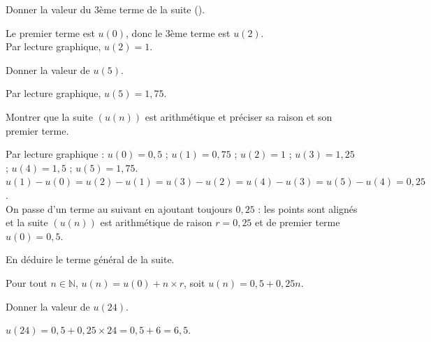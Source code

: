 \documentclass[11pt,a4paper]{article}  %
\begin{document}
\begin{enumMet}
	\item Donner la valeur du 3ème terme de la suite (\danger).
	\par
	\begin{corrBox}
		Le premier terme est $u(0)$, donc le 3ème terme est $u(2)$.\\
		Par lecture graphique, $u(2)=1$.
	\end{corrBox}

	\item Donner la valeur de $u(5)$.
	\par
	\begin{corrBox}
		Par lecture graphique, $u(5)=1,75$.
	\end{corrBox}

	\item Montrer que la suite $\left(u(n)\right)$ est arithmétique et préciser sa raison et son premier terme.
	\par
	\begin{corrBox}
		Par lecture graphique : $u(0)=0,5$ ; $u(1)=0,75$ ; $u(2)=1$ ; $u(3)=1,25$ ; $u(4)=1,5$ ; $u(5)=1,75$.\\
		$u(1)-u(0)=u(2)-u(1)=u(3)-u(2)=u(4)-u(3)=u(5)-u(4)=0,25$.\\
		On passe d'un terme au suivant en ajoutant toujours $0,25$ : les points sont alignés et la suite $\left(u(n)\right)$ est arithmétique de raison $r=0,25$ et de premier terme $u(0)=0,5$.
	\end{corrBox}

	\item En déduire le terme général de la suite.
	\par
	\begin{corrBox}
		Pour tout $n\in\mathbb{N}$, $u(n)=u(0)+n\times r$, soit $u(n)=0,5+0,25n$.
	\end{corrBox}

	\item {} Donner la valeur de $u(24)$.
	\par
	\begin{corrBox}
		$u(24)=0,5+0,25\times 24=0,5+6=6,5$.
	\end{corrBox}
\end{enumMet}
\end{document}
